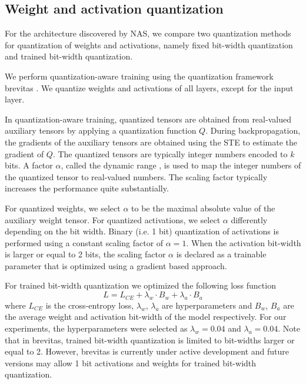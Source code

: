\documentclass[a4paper]{article}
\begin{document}
\subsection{Weight and activation quantization}
For the architecture discovered by NAS, we compare two quantization methods for quantization of weights and activations, namely fixed bit-width quantization and trained bit-width quantization.

We perform quantization-aware training using the quantization framework brevitas \cite{brevitas}. We quantize weights and activations of all layers, except for the input layer.

In quantization-aware training, quantized tensors are obtained from real-valued auxiliary tensors by applying a quantization function $Q$. During backpropagation, the gradients of the auxiliary tensors are obtained using the STE to estimate the gradient of $Q$. The quantized tensors are typically integer numbers encoded to $k$ bits. A factor $\alpha$, called the dynamic range \cite{Uhlich2019,Jain2020,Esser2020}, is used to map the integer numbers of the quantized tensor to real-valued numbers. The scaling factor typically increases the performance quite substantially.

For quantized weights, we select $\alpha$ to be the maximal absolute value of the auxiliary weight tensor. For quantized activations, we select $\alpha$ differently depending on the bit width. Binary (i.e. 1 bit) quantization of activations is performed using a constant scaling factor of $\alpha=1$. When the activation bit-width is larger or equal to 2 bits, the scaling factor $\alpha$ is declared as a trainable parameter that is optimized using a gradient based approach.

For trained bit-width quantization we optimized the following loss function
\begin{equation}
	\label{eq:loss}
	L = L_{CE} + \lambda_w \cdot B_w + \lambda_a \cdot B_a
\end{equation}
where $L_{CE}$ is the cross-entropy loss, $\lambda_w$, $\lambda_a$ are hyperparameters and $B_w$, $B_a$ are the average weight and activation bit-width of the model respectively. For our experiments, the hyperparameters were selected as $\lambda_w = 0.04$ and $\lambda_a = 0.04$. Note that in brevitas, trained bit-width quantization is limited to bit-widths larger or equal to 2. However, brevitas is currently under active development and future versions may allow 1 bit activations and weights for trained bit-width quantization.
\end{document}
